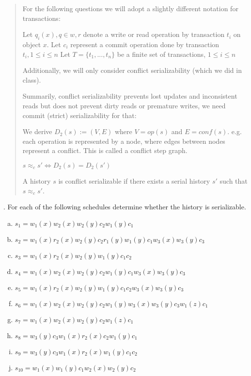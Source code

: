 \documentclass[parskip=full+, paper=a4, fontsize=12pt, ]{scrartcl}
\newcommand{\biim}{\mathbin{\Leftrightarrow}}
\newcounter{question}
\newcommand{\question}[1]{
    \stepcounter{question}
    \thequestion. #1 \hfill
}
\begin{document}
\begin{quote}
    For the following questions we will adopt a slightly different notation for transactions:

Let $q_i(x), q \in {w,r}$ denote a write or read operation by transaction $t_i$ on object $x$.
Let $c_i$ represent a commit operation done by transaction $t_i, 1 \leq i \leq n$
Let $T = \{t_1,...,t_n\}$ be a finite set of transactions, $1 \leq i \leq n$

Additionally, we will only consider conflict serializability (which we did in class). 

Summarily, conflict serializability prevents lost updates and inconsistent reads but does not prevent dirty reads or premature writes, we need commit (strict) serializability for that:

We derive $D_2(s) := (V,E)$ where $V = op(s)$ and $E = conf(s)$. e.g. each operation is represented by a node, where edges between nodes represent a conflict. This is called a conflict step graph.

$s \approx_c s' \biim D_2(s) = D_2(s')$

A history $s$ is conflict serializable if there exists a serial history $s'$ such that $s \approx_c s'$.

\end{quote}


\question{For each of the following schedules determine whether the history is serializable.}


\begin{enumerate}[(a)]
    \item$ s_1 = w_1(x)w_2(x)w_2(y)c_2 w_1(y)c_1$
    \item$ s_2 = w_1(x)r_2(x)w_2(y)c_2r_1(y)w_1(y)c_1w_3(x)w_3(y)c_3$
    \item$ s_3 = w_1(x)r_2(x)w_2(y)w_1(y)c_1c_2$
    \item$ s_4 = w_1(x)w_2(x)w_2(y)c_2w_1(y)c_1w_3(x)w_3(y)c_3$
    \item$ s_5 = w_1(x)r_2(x)w_2(y)w_1(y)c_1c_2w_3(x)w_3(y)c_3$
    \item$ s_6 = w_1(x)w_2(x)w_2(y)c_2w_1(y)w_3(x)w_3(y)c_3w_1(z)c_1$
    \item$ s_7 = w_1(x)w_2(x)w_2(y)c_2w_1(z)c_1$
    \item$ s_8 = w_3(y)c_3w_1(x)r_2(x)c_2w_1(y)c_1$
    \item$ s_9 = w_3(y)c_3w_1(x)r_2(x)w_1(y)c_1c_2$
    \item$ s_{10} = w_1(x)w_1(y)c_1w_2(x)w_2(y)c_2$
\end{enumerate}
\end{document}
